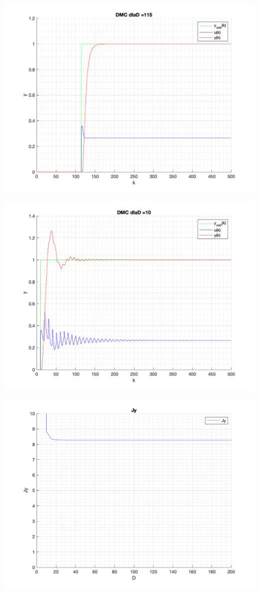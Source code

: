 \documentclass[a4paper, 11pt]{article}
\begin{document}
\begin{enumerate}
 \includegraphics[width=\linewidth]{./ModelsP4_D/P4_DMC_D_115_png.png} 
 
 \includegraphics[width=\linewidth]{./ModelsP4_D/P4_DMC_D_10_png.png} 
 
 \includegraphics[width=\linewidth]{./ModelsP4_J/JyD.png} 
 

\end{enumerate}
\end{document}
